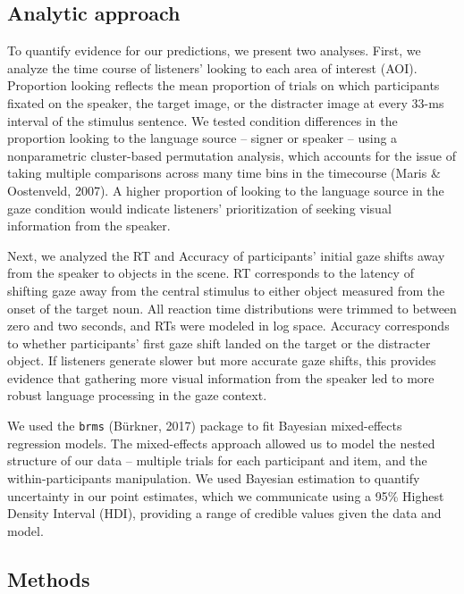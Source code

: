 \documentclass[10pt, letterpaper]{article}
\begin{document}
\hypertarget{analytic-approach}{%
\subsection{Analytic approach}\label{analytic-approach}}

To quantify evidence for our predictions, we present two analyses.
First, we analyze the time course of listeners' looking to each area of
interest (AOI). Proportion looking reflects the mean proportion of
trials on which participants fixated on the speaker, the target image,
or the distracter image at every 33-ms interval of the stimulus
sentence. We tested condition differences in the proportion looking to
the language source -- signer or speaker -- using a nonparametric
cluster-based permutation analysis, which accounts for the issue of
taking multiple comparisons across many time bins in the timecourse
(Maris \& Oostenveld, 2007). A higher proportion of looking to the
language source in the gaze condition would indicate listeners'
prioritization of seeking visual information from the speaker.

Next, we analyzed the RT and Accuracy of participants' initial gaze
shifts away from the speaker to objects in the scene. RT corresponds to
the latency of shifting gaze away from the central stimulus to either
object measured from the onset of the target noun. All reaction time
distributions were trimmed to between zero and two seconds, and RTs were
modeled in log space. Accuracy corresponds to whether participants'
first gaze shift landed on the target or the distracter object. If
listeners generate slower but more accurate gaze shifts, this provides
evidence that gathering more visual information from the speaker led to
more robust language processing in the gaze context.

We used the \texttt{brms} (Bürkner, 2017) package to fit Bayesian
mixed-effects regression models. The mixed-effects approach allowed us
to model the nested structure of our data -- multiple trials for each
participant and item, and the within-participants manipulation. We used
Bayesian estimation to quantify uncertainty in our point estimates,
which we communicate using a 95\% Highest Density Interval (HDI),
providing a range of credible values given the data and model.

\hypertarget{methods}{%
\subsection{Methods}\label{methods}}
\end{document}
